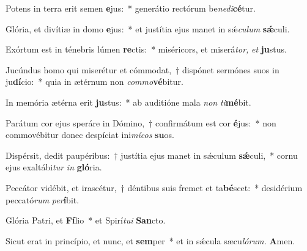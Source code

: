 \item Potens in terra erit semen \textbf{e}jus:~* generátio rectórum be\tinyhspace\textit{nedi}\textbf{cé}tur.
\item Glória, et divítiæ in domo \textbf{e}jus:~* et justítia ejus manet in sǽ\tinyhspace\textit{culum} \textbf{sǽ}culi.
\item Exórtum est in ténebris lúmen \textbf{re}ctis:~* miséricors, et miserá\tinyhspace\textit{tor,} \textit{et} \textbf{ju}stus.
\item Jucúndus homo qui miserétur et cómmodat,~† dispónet sermónes suos in ju\textbf{dí}cio:~* quia in ætérnum non \textit{commo}\textbf{vé}bitur.
\item In memória ætérna erit \textbf{ju}stus:~* ab auditióne mala \textit{non} \textit{ti}\textbf{mé}bit.
\item Parátum cor ejus speráre in Dómino,~† confirmátum est cor \textbf{é}jus:~* non commovébitur donec despíciat ini\textit{mícos} \textbf{su}os.
\item Dispérsit, dedit paupéribus:~† justítia ejus manet in sǽculum \textbf{sǽ}culi,~* cornu ejus exaltábi\tinyhspace\textit{tur} \textit{in} \textbf{gló}ria.
\item Peccátor vidébit, et irascétur,~† déntibus suis fremet et ta\textbf{bé}scet:~* desidérium peccató\textit{rum} \textit{per}\textbf{í}bit.
\item Glória Patri, et \textbf{Fí}lio~* et Spirí\tinyhspace\textit{tui} \textbf{San}cto.
\item Sicut erat in princípio, et nunc, et \textbf{sem}per~* et in sǽcula sæcu\tinyhspace\textit{lórum.} \textbf{A}men.